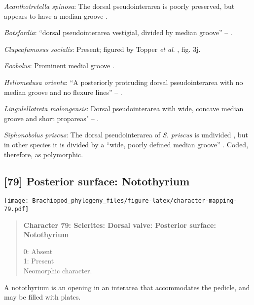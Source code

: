 \documentclass[openany]{book}
\theoremstyle{definition}
\theoremstyle{definition}
\theoremstyle{definition}
\theoremstyle{remark}
\begin{document}
\hypertarget{Acanthotretella_spinosa-coding-78}{}
\emph{Acanthotretella spinosa}: The dorsal pseudointerarea is poorly
preserved, but appears to have a median groove
\citep{Holmer2006Aspinose}.

\hypertarget{Botsfordia-coding-78}{}
\emph{Botsfordia}: ``dorsal pseudointerarea vestigial, divided by median
groove'' -- \citet{Williams2000LinguliformeaCraniiformea}.

\hypertarget{Clupeafumosus_socialis-coding-78}{}
\emph{Clupeafumosus socialis}: Present; figured by Topper \emph{et al}.
\citeyearpar{Topper2013Reappraisalof}, fig. 3j.

\hypertarget{Eoobolus-coding-78}{}
\emph{Eoobolus}: Prominent medial groove
\citep{Balthasar2009Thebrachiopod}.

\hypertarget{Heliomedusa_orienta-coding-78}{}
\emph{Heliomedusa orienta}: ``A posteriorly protruding dorsal
pseudointerarea with no median groove and no flexure lines'' --
\citet{Chen2007Reinterpretationof}.

\hypertarget{Lingulellotreta_malongensis-coding-78}{}
\emph{Lingulellotreta malongensis}: Dorsal pseudointerarea with wide,
concave median groove and short propareas" --
\citet{Williams2000LinguliformeaCraniiformea}.

\hypertarget{Siphonobolus_priscus-coding-78}{}
\emph{Siphonobolus priscus}: The dorsal pseudointerarea of \emph{S.
priscus} is undivided \citep{Popov2009Earlyontogeny}, but in other
species it is divided by a ``wide, poorly defined median groove''
\citep{Williams2000LinguliformeaCraniiformea}. Coded, therefore, as
polymorphic.

\subsection*{{[}79{]} Posterior surface:
Notothyrium}\label{posterior-surface-notothyrium}

\texttt{[image: Brachiopod\_phylogeny\_files/figure-latex/character-mapping-79.pdf]}

\begin{quote}
\textbf{Character 79: Sclerites: Dorsal valve: Posterior surface:
Notothyrium}

0: Absent\\
1: Present\\
Neomorphic character.
\end{quote}

A notothyrium is an opening in an interarea that accommodates the
pedicle, and may be filled with plates.
\end{document}
